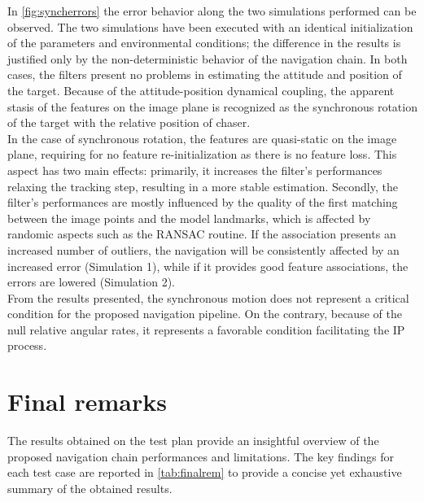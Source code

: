In \cref{fig:syncherrors} the error behavior along the two simulations performed can be observed. The two simulations have been executed with an identical initialization of the parameters and environmental conditions; the difference in the results is justified only by the non-deterministic behavior of the navigation chain. In both cases, the filters present no problems in estimating the attitude and position of the target. Because of the attitude-position dynamical coupling, the apparent stasis of the features on the image plane is recognized as the synchronous rotation of the target with the relative position of chaser. \\
 In the case of synchronous rotation, the features are quasi-static on the image plane, requiring for no feature re-initialization as there is no feature loss. This aspect has two main effects: primarily, it increases the filter's performances relaxing the tracking step, resulting in a more stable estimation. Secondly, the filter's performances are mostly influenced by the quality of the first matching between the image points and the model landmarks, which is affected by randomic aspects such as the RANSAC routine. If the association presents an increased number of outliers, the navigation will be consistently affected by an increased error (Simulation 1), while if it provides good feature associations, the errors are lowered (Simulation 2).\\
From the results presented, the synchronous motion does not represent a critical condition for the proposed navigation pipeline. On the contrary, because of the null relative angular rates, it represents a favorable condition facilitating the IP process.

\section{Final remarks}
The results obtained on the test plan provide an insightful overview of the proposed navigation chain performances and limitations. The key findings for each test case are reported in \cref{tab:finalrem} to provide a concise yet exhaustive summary of the obtained results. 

